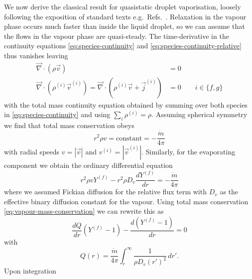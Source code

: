 \documentclass[11pt,twoside]{report}
\begin{document}
We now derive the classical result for quasistatic droplet vaporisation, loosely following the exposition of standard texts e.g.\ Refs.\ \cite{Slattery1999, Sirignano2010}.
Relaxation in the vapour phase occurs much faster than inside the liquid droplet, so we can assume that the flows in the vapour phase are quasi-steady.
The time-derivative in the continuity equations \eqref{eq:species-continuity} and \eqref{eq:species-continuity-relative} thus vanishes leaving
\begin{subequations}
  \begin{align}
    \vec{\nabla} \cdot (\rho \vec{v})
    &=
    0
    \\
    \vec{\nabla} \cdot (\rho^{(i)} \vec{v}^{(i)})
    =
    \vec{\nabla} \cdot (\rho^{(i)} \vec{v} + \vec{j}^{(i)})
    &=
    0
    \qquad i \in \{f,g\}
  \end{align}
\end{subequations}
with the total mass continuity equation obtained by summing over both species in \eqref{eq:species-continuity} and using $\sum_i \rho^{(i)} = \rho$.
Assuming spherical symmetry we find that total mass conservation obeys
\begin{equation}\label{eq:vapour-mass-conservation}
  r ^2 \rho v
  =
  \textrm{constant}
  =
  -\frac{\dot{m}}{4\pi}
\end{equation}
with radial speeds $v = |\vec{v}|$ and $v^{(i)} = |\vec{v}^{(i)}|$.
Similarly, for the evaporating component we obtain the ordinary differential equation
\begin{equation*}\label{eq:quasistatic-vapour-species-conservation}
  r^2 \rho v Y^{(f)} - r^2 \rho D_v \frac{d Y^{(f)}}{dr}
  =
  -\frac{\dot{m}}{4\pi}
\end{equation*}
where we assumed Fickian diffusion for the relative flux term with $D_v$ as the effective binary diffusion constant for the vapour.
Using total mass conservation \eqref{eq:vapour-mass-conservation} we can rewrite this as
\begin{equation}\label{eq:vapour-ode}
  \frac{d Q}{dr} (Y^{(f)} - 1)
  - \frac{d (Y^{(f)} - 1)}{dr}
  = 0
\end{equation}
with
\begin{equation}\label{eq:vapour-ode-integration-factor}
  Q(r)
  =
  \frac{\dot{m}}{4\pi}
  \int_r^\infty  \frac{1}{\rho D_v (r')^2} \, dr'.
\end{equation}
Upon integration%
\end{document}

